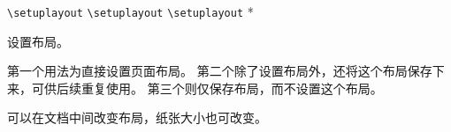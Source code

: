 \documentclass[twoside]{book}
\begin{document}
\begin{function}{\setuplayout}
  \begin{syntax}
    \verb|\setuplayout|                \;
    \verb|\setuplayout|    
    \verb|\setuplayout| *  
  \end{syntax}
设置布局。

第一个用法为直接设置页面布局。
第二个除了设置布局外，还将这个布局保存下来，可供后续重复使用。
第三个则仅保存布局，而不设置这个布局。

可以在文档中间改变布局，纸张大小也可改变。
\end{function}

\def\gpart#1{\textsf{\textsl{\color[rgb]{.0,.45,.7}#1}}}
\end{document}
